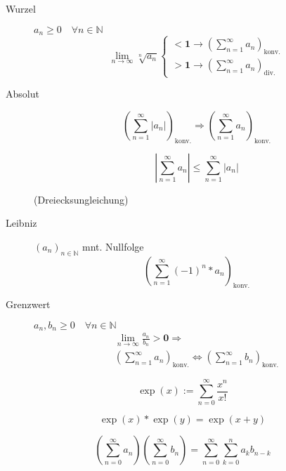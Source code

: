 \documentclass[uniLeipzig]{merkzettel}
\begin{document}
\begin{mzImportant}
\begin{description}
    \item [Wurzel]
          $a_n \geq 0 \quad \forall n \in \mathbb{N}$
          $$
            \lim_{n \rightarrow \infty} \sqrt[n]{a_n} \begin{cases}
              \mathbf{< 1} \rightarrow (\sum_{n = 1}^\infty a_n)_\text{konv.} \\
              \mathbf{> 1} \rightarrow (\sum_{n = 1}^\infty a_n)_\text{div.}
            \end{cases}
          $$

    \item [Absolut]
          $$(\sum_{n=1}^\infty | a_n |)_\text{konv.} \Rightarrow (\sum_{n=1}^\infty a_n)_\text{konv.}$$

          $$| \sum_{n=1}^\infty a_n | \leq \sum_{n=1}^\infty | a_n |$$

          (Dreiecksungleichung)

    \item [Leibniz] $(a_n)_{n \in \mathbb{N}}$ mnt. Nullfolge
          $$(\sum_{n=1}^\infty (-1)^n * a_n)_\text{konv.}$$

    \item [Grenzwert] $a_n, b_n \geq 0 \quad \forall n \in \mathbb{N}$
          \begin{gather*}
            \lim_{n \rightarrow \infty} \frac{a_n}{b_n} \mathbf{> 0} \Rightarrow \\
            (\sum_{n=1}^\infty a_n)_\text{konv.} \Leftrightarrow (\sum_{n=1}^\infty b_n)_\text{konv.}
          \end{gather*}
  \end{description}
\end{mzImportant}

\begin{mzImportant}
  $$\exp(x) := \sum_{n = 0}^\infty \frac{x^n}{x!}$$
\end{mzImportant}

\begin{mzImportant}
  $$\exp(x) * \exp(y) = \exp(x + y)$$
\end{mzImportant}

\begin{mzImportant}
  $$(\sum_{n = 0}^\infty a_n)(\sum_{n = 0}^\infty b_n) = \sum_{n = 0}^\infty \sum_{k = 0}^n a_k b_{n - k}$$
\end{mzImportant}
\end{document}
